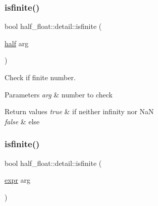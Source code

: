 \subsubsection{\texorpdfstring{isfinite()}{isfinite()}\hspace{0.1cm}{\footnotesize\ttfamily [1/2]}}
{\footnotesize\ttfamily bool half\+\_\+float\+::detail\+::isfinite (\begin{DoxyParamCaption}\item[{\hyperlink{classhalf__float_1_1half}{half}}]{arg }\end{DoxyParamCaption})\hspace{0.3cm}{\ttfamily [inline]}}

Check if finite number. 
\begin{DoxyParams}{Parameters}
{\em arg} & number to check \\
\hline
\end{DoxyParams}

\begin{DoxyRetVals}{Return values}
{\em true} & if neither infinity nor NaN \\
\hline
{\em false} & else \\
\hline
\end{DoxyRetVals}
\mbox{\label{namespacehalf__float_1_1detail_a7d652c289107cb5f35c591f89bdffe36}} 
\subsubsection{\texorpdfstring{isfinite()}{isfinite()}\hspace{0.1cm}{\footnotesize\ttfamily [2/2]}}
{\footnotesize\ttfamily bool half\+\_\+float\+::detail\+::isfinite (\begin{DoxyParamCaption}\item[{\hyperlink{structhalf__float_1_1detail_1_1expr}{expr}}]{arg }\end{DoxyParamCaption})\hspace{0.3cm}{\ttfamily [inline]}}

\mbox{\label{namespacehalf__float_1_1detail_ac6634b70f77be4d111f27b801e5db865}} 

